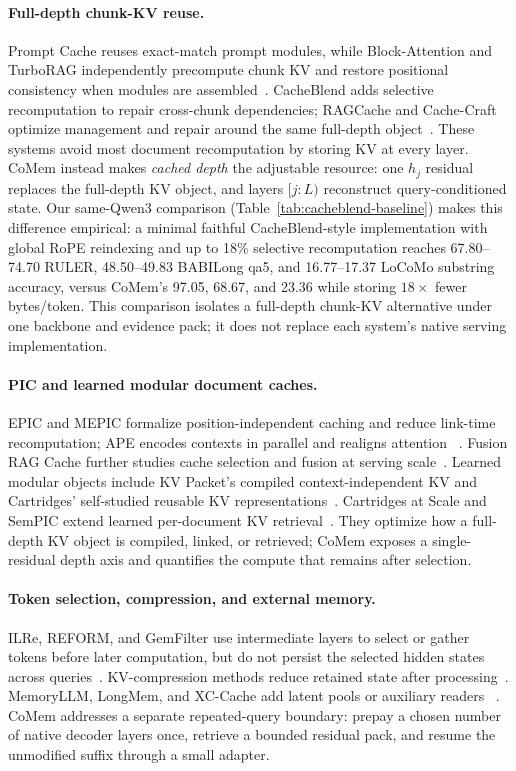 \paragraph{Full-depth chunk-KV reuse.}
Prompt Cache reuses exact-match prompt modules, while Block-Attention and
TurboRAG independently precompute chunk KV and restore positional consistency
when modules are assembled~\citep{promptcache,blockattention,turborag}.
CacheBlend adds selective recomputation to repair cross-chunk dependencies;
RAGCache and Cache-Craft optimize management and repair around the same
full-depth object~\citep{cacheblend,ragcache,cachecraft}. These systems avoid
most document recomputation by storing KV at every layer. CoMem instead makes
\emph{cached depth} the adjustable resource: one $h_j$ residual replaces the
full-depth KV object, and layers $[j{:}L)$ reconstruct query-conditioned state.
Our same-Qwen3 comparison (Table~\ref{tab:cacheblend-baseline}) makes this
difference empirical: a minimal faithful CacheBlend-style implementation with
global RoPE reindexing and up to 18\% selective recomputation reaches
67.80--74.70 RULER, 48.50--49.83 BABILong qa5, and 16.77--17.37 LoCoMo
substring accuracy, versus CoMem's 97.05, 68.67, and 23.36 while storing
$18\times$ fewer bytes/token. This comparison isolates a full-depth
chunk-KV alternative under one backbone and evidence pack; it does not replace
each system's native serving implementation.

\paragraph{PIC and learned modular document caches.}
EPIC and MEPIC formalize position-independent caching and reduce link-time
recomputation; APE encodes contexts in parallel and realigns attention
~\citep{epic,mepic,ape}. Fusion RAG Cache further studies cache selection and
fusion at serving scale~\citep{fusionrag}. Learned modular objects include KV
Packet's compiled context-independent KV and Cartridges' self-studied reusable
KV representations~\citep{kvpacket,cartridgesbase}. Cartridges at Scale and
SemPIC extend learned per-document KV retrieval~\citep{cartridges,sempic}.
They optimize how a full-depth KV object is compiled, linked, or retrieved;
CoMem exposes a single-residual depth axis and quantifies the compute that
remains after selection.

\paragraph{Token selection, compression, and external memory.}
ILRe, REFORM, and GemFilter use intermediate layers to select or gather tokens
before later computation, but do not persist the selected hidden states across
queries~\citep{ilre,reform,gemfilter}. KV-compression methods reduce retained
state after processing~\citep{streamingllm,h2o,snapkv,pyramidkv,minicache}.
MemoryLLM, LongMem, and XC-Cache add latent pools or auxiliary readers
~\citep{memoryllm,longmem,xccache}. CoMem addresses a separate repeated-query
boundary: prepay a chosen number of native decoder layers once, retrieve a
bounded residual pack, and resume the unmodified suffix through a small
adapter.


